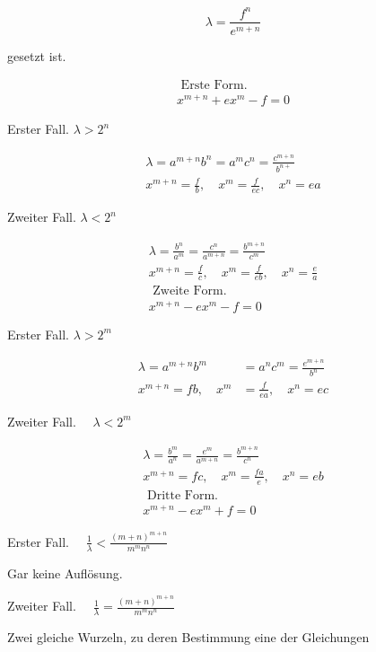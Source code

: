 \documentclass[10pt]{article}
\begin{document}
\[
\lambda=\frac{f^{n}}{e^{m+n}}
\]

gesetzt ist.

\[
\begin{gathered}
\text { Erste Form. } \\
x^{m+n}+e x^{m}-f=0
\end{gathered}
\]

Erster Fall. \(\lambda>2^{n}\)

\[
\begin{gathered}
\lambda=a^{m+n} b^{n}=a^{m} c^{n}=\frac{c^{m+n}}{b^{n+}} \\
x^{m+n}=\frac{f}{b}, \quad x^{m}=\frac{f}{e c}, \quad x^{n}=e a
\end{gathered}
\]

Zweiter Fall. \(\lambda<2^{n}\)

\[
\begin{gathered}
\lambda=\frac{b^{n}}{a^{m}}=\frac{c^{n}}{a^{m+n}}=\frac{b^{m+n}}{c^{m}} \\
x^{m+n}=\frac{f}{c}, \quad x^{m}=\frac{f}{e b}, \quad x^{n}=\frac{e}{a} \\
\text { Zweite Form. } \\
x^{m+n}-e x^{m}-f=0
\end{gathered}
\]

Erster Fall. \(\lambda>2^{m}\)

\[
\begin{aligned}
\lambda=a^{m+n} b^{m} & =a^{n} c^{m}=\frac{e^{m+n}}{b^{n}} \\
x^{m+n}=f b, \quad x^{m} & =\frac{f}{e a}, \quad x^{n}=e c
\end{aligned}
\]

Zweiter Fall. \(\quad \lambda<2^{m}\)

\[
\begin{gathered}
\lambda=\frac{b^{m}}{a^{n}}=\frac{e^{m}}{a^{m+n}}=\frac{b^{m+n}}{c^{n}} \\
x^{m+n}=f c, \quad x^{m}=\frac{f a}{e}, \quad x^{n}=e b \\
\text { Dritte Form. } \\
x^{m+n}-e x^{m}+f=0
\end{gathered}
\]

Erster Fall. \(\quad \frac{1}{\lambda}<\frac{(m+n)^{m+n}}{m^{m} n^{n}}\)

Gar keine Auflösung.

Zweiter Fall. \(\quad \frac{1}{\lambda}=\frac{(m+n)^{m+n}}{m^{m} n^{n}}\)

Zwei gleiche Wurzeln, zu deren Bestimmung eine der Gleichungen
\end{document}
